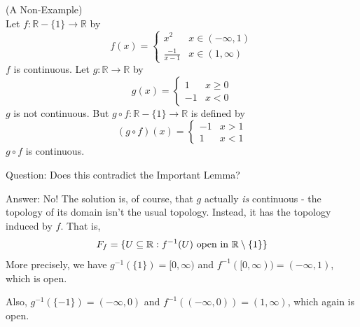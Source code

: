 \begin{example}
	(A Non-Example)\\
	Let $f: \mathbb{R}-\{1\} \rightarrow \mathbb{R}$ by
	\[ f(x) = 
	\begin{cases}
		x^2 & x\in(-\infty, 1) \\
		\frac{-1}{x-1} & x\in (1, \infty) 
	\end{cases}
	\]
	$f$ is continuous. Let $g: \mathbb{R} \rightarrow \mathbb{R}$ by
	\[ g(x) = 
	\begin{cases}
		1 & x\ge 0 \\
		-1 & x < 0 
	\end{cases}
	\]
	$g$ is not continuous. But $g \circ f: \mathbb{R}-\{1\} \rightarrow \mathbb{R}$ is defined by
	\[ (g\circ f)(x) = 
	\begin{cases}
		-1 & x > 1 \\
		1 & x < 1 
	\end{cases}
	\]
	$g \circ f$ is continuous. 
\end{example}
Question: Does this contradict the Important Lemma?

Answer: No! The solution is, of course, that $g$ actually \emph{is} continuous - the topology of its domain isn't the usual topology. Instead, it has the topology induced by $f$. That is,
\[F_f = \{ U\subseteq \mathbb R : f^{-1}(U)\text{ open in }\mathbb R\setminus\{1\} \}\]
More precisely, we have $g^{-1}(\{ 1\}) = [0, \infty)$ and $f^{-1}([0, \infty)) = (-\infty,1)$, which is open.

Also, $g^{-1}( \{-1 \} ) = (-\infty,0)$ and $f^{-1}((-\infty, 0)) = (1, \infty)$, which again is open.


